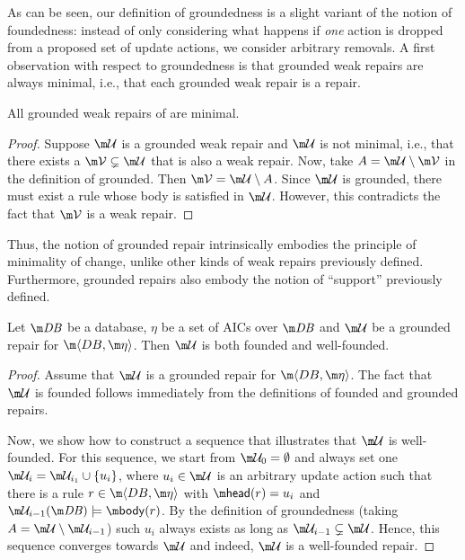 As can be seen, our definition of groundedness is a slight variant of the notion of foundedness: instead of only considering what happens if \emph{one} action is dropped from a proposed set of update actions, we consider arbitrary removals. 
A first observation with respect to groundedness is that grounded weak repairs are always minimal, i.e., that each grounded weak repair is a repair. 
\begin{lemma}
 All grounded weak repairs of \fulldb are minimal. 
\end{lemma}
\begin{proof}
 Suppose $\UU$ is a grounded weak repair and $\UU$ is not minimal, i.e., that there exists a $\VV\subsetneq \UU$ that is also a weak repair. 
 Now, take $A = \UU\setminus \VV$ in the definition of grounded. Then $\VV = \UU\setminus A$. Since $\UU$ is grounded, there must exist a rule whose body is satisfied in $\UU$. However, this contradicts the fact  that $\VV$ is a weak repair. 
\end{proof}
Thus, the notion of grounded repair intrinsically embodies the principle of minimality of change, unlike other kinds of weak repairs previously defined.
Furthermore, grounded repairs also embody the notion of ``support'' previously defined.



\begin{lemma}
  \label{lem:founded}
  Let $\db$ be a database, $\eta$ be a set of AICs over $\db$ and $\UU$ be a grounded repair for $\fulldb$.
  Then $\UU$ is both founded and well-founded.
\end{lemma}
\begin{proof}
  Assume that $\UU$ is a grounded repair for $\fulldb$.
  The fact that $\UU$ is founded follows immediately from the definitions of founded and grounded repairs. 
  
%   
%   
%   

  Now, we show how to construct a sequence that illustrates that $\UU$ is well-founded. 
  For this sequence, we start from $\UU_0=\emptyset$ and always set one $\UU_i = \UU_{i_1}\cup \{u_i\}$, where $u_i\in \UU$ is an arbitrary update action such that there is a rule $r\in \fulldb$ with $\head(r) = u_i$ and $\UU_{i-1}(\db)\models \body(r)$. By the definition of groundedness (taking $A=\UU\setminus \UU_{i-1}$) such $u_i$ always exists as long as $\UU_{i-1} \subsetneq \UU$. Hence, this sequence converges towards $\UU$ and indeed, $\UU$ is a well-founded repair. 
%   
%   
\end{proof}


